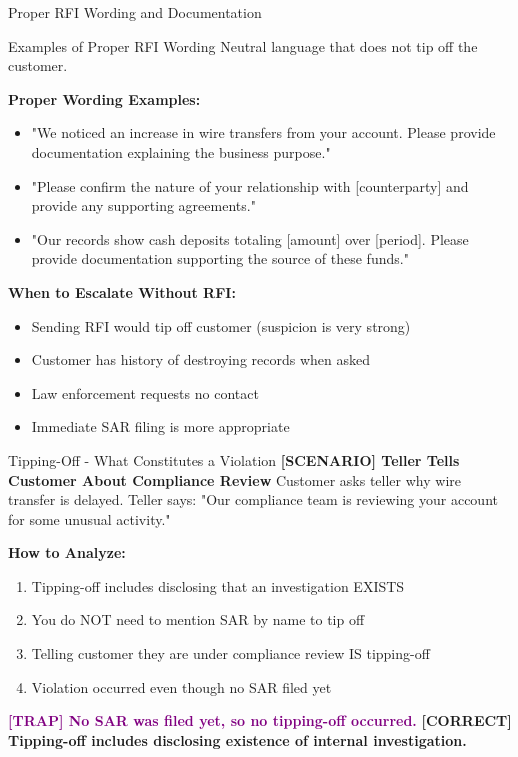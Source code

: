 \documentclass[11pt,a4paper]{beamer}
\newcommand{\trap}[1]{\textcolor{purple}{\textbf{[TRAP] #1}}}
\newcommand{\correct}[1]{\textcolor{green!50!black}{\textbf{[CORRECT] #1}}}
\newcommand{\scenario}[1]{\textcolor{blue!70!black}{\textbf{[SCENARIO] #1}}}
\begin{document}
	\begin{frame}{Proper RFI Wording and Documentation}
		\begin{block}{Examples of Proper RFI Wording}
			Neutral language that does not tip off the customer.
		\end{block}
		\textbf{Proper Wording Examples:}
		\begin{itemize}
			\item "We noticed an increase in wire transfers from your account. Please provide documentation explaining the business purpose."
			\item "Please confirm the nature of your relationship with [counterparty] and provide any supporting agreements."
			\item "Our records show cash deposits totaling [amount] over [period]. Please provide documentation supporting the source of these funds."
		\end{itemize}
		\textbf{When to Escalate Without RFI:}
		\begin{itemize}
			\item Sending RFI would tip off customer (suspicion is very strong)
			\item Customer has history of destroying records when asked
			\item Law enforcement requests no contact
			\item Immediate SAR filing is more appropriate
		\end{itemize}
	\end{frame}
	
	
	\begin{frame}{Tipping-Off - What Constitutes a Violation}
		\scenario{Teller Tells Customer About Compliance Review}
		Customer asks teller why wire transfer is delayed. Teller says: "Our compliance team is reviewing your account for some unusual activity."
		
		\vspace{0.1cm}
		\textbf{How to Analyze:}
		\begin{enumerate}
			\item Tipping-off includes disclosing that an investigation EXISTS
			\item You do NOT need to mention SAR by name to tip off
			\item Telling customer they are under compliance review IS tipping-off
			\item Violation occurred even though no SAR filed yet
		\end{enumerate}
		\trap{No SAR was filed yet, so no tipping-off occurred.}
		\correct{Tipping-off includes disclosing existence of internal investigation.}
	\end{frame}
	
\end{document}
